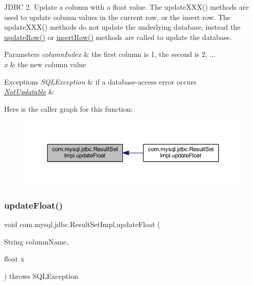 J\+D\+BC 2. Update a column with a float value. The update\+X\+X\+X() methods are used to update column values in the current row, or the insert row. The update\+X\+X\+X() methods do not update the underlying database, instead the \mbox{\hyperlink{classcom_1_1mysql_1_1jdbc_1_1_result_set_impl_a2842d32292d023aaeeafedeed3322981}{update\+Row()}} or \mbox{\hyperlink{classcom_1_1mysql_1_1jdbc_1_1_result_set_impl_a78e304e3279cbcf60392f18c1385e3bf}{insert\+Row()}} methods are called to update the database.


\begin{DoxyParams}{Parameters}
{\em column\+Index} & the first column is 1, the second is 2, ... \\
\hline
{\em x} & the new column value\\
\hline
\end{DoxyParams}

\begin{DoxyExceptions}{Exceptions}
{\em S\+Q\+L\+Exception} & if a database-\/access error occurs \\
\hline
{\em \mbox{\hyperlink{classcom_1_1mysql_1_1jdbc_1_1_not_updatable}{Not\+Updatable}}} & \\
\hline
\end{DoxyExceptions}
Here is the caller graph for this function\+:
\nopagebreak
\begin{figure}[H]
\begin{center}
\leavevmode
\includegraphics[width=350pt]{classcom_1_1mysql_1_1jdbc_1_1_result_set_impl_a4f0a2514b5e2218b899cf71697f57b0f_icgraph}
\end{center}
\end{figure}
\mbox{\label{classcom_1_1mysql_1_1jdbc_1_1_result_set_impl_a075591244c917aa7694d8f5d6cfa8025}} 
\subsubsection{\texorpdfstring{update\+Float()}{updateFloat()}\hspace{0.1cm}{\footnotesize\ttfamily [2/2]}}
{\footnotesize\ttfamily void com.\+mysql.\+jdbc.\+Result\+Set\+Impl.\+update\+Float (\begin{DoxyParamCaption}\item[{String}]{column\+Name,  }\item[{float}]{x }\end{DoxyParamCaption}) throws S\+Q\+L\+Exception}

